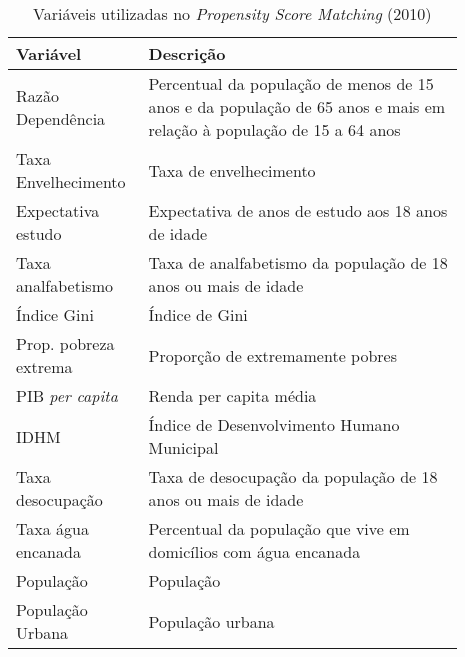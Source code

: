 \begin{table}
    \centering
    \caption{Variáveis utilizadas no \textit{Propensity Score Matching} (2010)}

    \begin{tabular}{m{0.23\linewidth}|m{0.66\linewidth}}
        Variável & Descrição \\

        \toprule\toprule
        Razão Dependência & Percentual da população de menos de 15 anos e da população de 65 anos e mais em relação à população de 15 a 64 anos \\

        \midrule
        Taxa Envelhecimento	 & Taxa de envelhecimento \\

        \midrule
        Expectativa estudo & Expectativa de anos de estudo aos 18 anos de idade \\

        \midrule
        Taxa analfabetismo & Taxa de analfabetismo da população de 18 anos ou mais de idade	\\

        \midrule
        Índice Gini & Índice de Gini \\

        \midrule
        Prop. pobreza extrema & Proporção de extremamente pobres \\

        \midrule
        PIB \textit{per capita} & Renda per capita média \\

        \midrule
        IDHM & Índice de Desenvolvimento Humano Municipal \\

        \midrule
        Taxa desocupação & Taxa de desocupação da população de 18 anos ou mais de idade	
        \\

        \midrule
        Taxa água encanada & Percentual da população que vive em domicílios com água encanada	
        \\

        \midrule
        População & População \\

        \midrule
        População Urbana & População urbana	
        \\




    \end{tabular}

    \label{tab_variaveis-psm}
\end{table}

